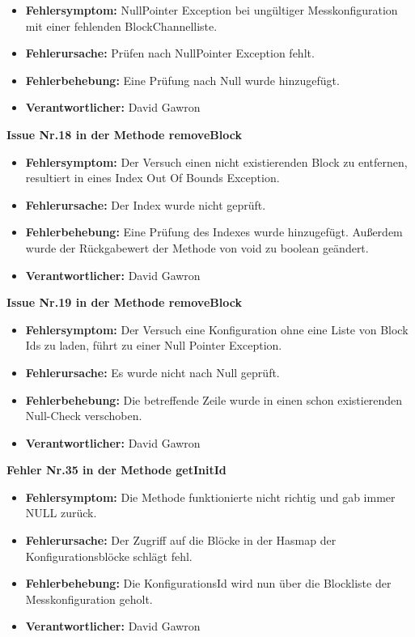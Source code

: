 \documentclass[parskip=full]{scrartcl}
\begin{document}
\begin{description}
\begin{itemize}
\item []\textbf{Fehlersymptom:} NullPointer Exception bei ungültiger Messkonfiguration mit einer fehlenden BlockChannelliste.
\item []\textbf{Fehlerursache:} Prüfen nach NullPointer Exception fehlt.
\item []\textbf{Fehlerbehebung:} Eine Prüfung nach Null wurde hinzugefügt.
\item []\textbf{Verantwortlicher:} David Gawron
\end{itemize}


\item []\textbf{Issue Nr.18 in der Methode removeBlock} 

\begin{itemize}
\item []\textbf{Fehlersymptom:} Der Versuch einen nicht existierenden Block zu entfernen, resultiert in eines Index Out Of Bounds Exception.
\item []\textbf{Fehlerursache:} Der Index wurde nicht geprüft.
\item []\textbf{Fehlerbehebung:} Eine Prüfung des Indexes wurde hinzugefügt. Außerdem wurde der Rückgabewert der Methode von void zu boolean geändert.
\item []\textbf{Verantwortlicher:} David Gawron
\end{itemize}

\item []\textbf{Issue Nr.19 in der Methode removeBlock} 

\begin{itemize}
\item []\textbf{Fehlersymptom:} Der Versuch eine Konfiguration ohne eine Liste von Block Ids zu laden, führt zu einer Null Pointer Exception.
\item []\textbf{Fehlerursache:} Es wurde nicht nach Null geprüft.
\item []\textbf{Fehlerbehebung:} Die betreffende Zeile wurde in einen schon existierenden Null-Check verschoben.
\item []\textbf{Verantwortlicher:} David Gawron
\end{itemize}




\item []\textbf{Fehler Nr.35 in der Methode getInitId} 

\begin{itemize}
\item []\textbf{Fehlersymptom:} Die Methode funktionierte nicht richtig und gab immer NULL zurück.
\item []\textbf{Fehlerursache:} Der Zugriff auf die Blöcke in der Hasmap der Konfigurationsblöcke schlägt fehl.
\item []\textbf{Fehlerbehebung:} Die KonfigurationsId wird nun über die Blockliste der Messkonfiguration geholt.
\item []\textbf{Verantwortlicher:} David Gawron
\end{itemize}



\end{description}
\end{document}

